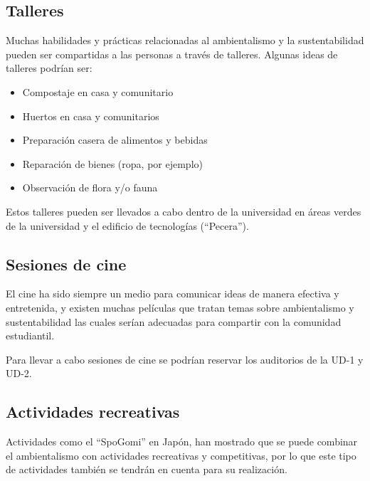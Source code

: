 \subsection{Talleres}

Muchas habilidades y prácticas relacionadas al ambientalismo y la sustentabilidad pueden ser compartidas a las personas a través de talleres. Algunas ideas de talleres podrían ser:

\begin{itemize}
    \item Compostaje en casa y comunitario
    \item Huertos en casa y comunitarios
    \item Preparación casera de alimentos y bebidas
    \item Reparación de bienes (ropa, por ejemplo)
    \item Observación de flora y/o fauna
\end{itemize}

Estos talleres pueden ser llevados a cabo dentro de la universidad en áreas verdes de la universidad y el edificio de tecnologías (“Pecera”).

\subsection{Sesiones de cine}

El cine ha sido siempre un medio para comunicar ideas de manera efectiva y entretenida, y existen muchas películas que tratan temas sobre ambientalismo y sustentabilidad las cuales serían adecuadas para compartir con la comunidad estudiantil.

Para llevar a cabo sesiones de cine se podrían reservar los auditorios de la UD-1 y UD-2.

\subsection{Actividades recreativas}

Actividades como el ``SpoGomi'' en Japón, han mostrado que se puede combinar el ambientalismo con actividades recreativas y competitivas, por lo que este tipo de actividades también se tendrán en cuenta para su realización.
